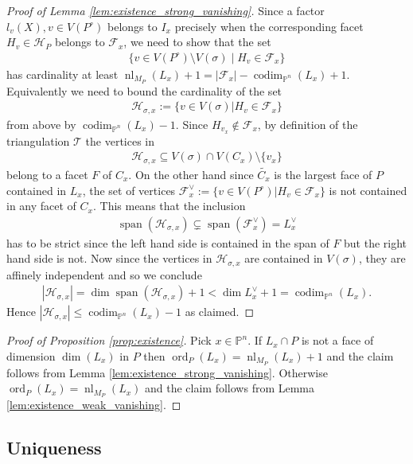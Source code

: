 \documentclass[a4paper,10pt]{amsart}
\theoremstyle{definition}
\theoremstyle{plain}
\newcommand{\codim}{\operatorname{codim}}
\newcommand{\ord}{\operatorname{ord}}
\newcommand{\nl}{\operatorname{nl}}
\newcommand{\Span}{\operatorname{span}}
\newcommand{\cF}{{\mathcal F}}
\newcommand{\cH}{{\mathcal H}}
\newcommand{\cT}{{\mathcal T}}
\newcommand{\pp}{\mathbb{P}}
\begin{document}
\begin{proof}[Proof of Lemma \ref{lem:existence_strong_vanishing}]
Since a factor $l_v(X), v \in V(P^\circ)$ belongs to $I_x$ precisely when the corresponding facet $H_v\in \cH_P$ belongs to $\cF_x$, we need to show that the set \begin{align*}
        \{v \in V(P^\circ)\setminus V(\sigma)\mid H_v \in \cF_x\}
    \end{align*}
    has cardinality at least $\nl_{M_P}(L_x)+1=|\cF_x|-\codim_{\pp^n}(L_x)+1$. Equivalently we need to bound the cardinality of the set \begin{align*}
       \cH_{\sigma,x}:= \{v \in V(\sigma)| H_v\in \cF_x\} 
    \end{align*}
    from above by $\codim_{\pp^n}(L_x)-1$. Since $H_{v_x}\notin \cF_x$, by definition of the triangulation $\cT$ the vertices in \begin{align*}
        \cH_{\sigma,x}\subseteq V(\sigma)\cap V(C_x)\setminus \{v_x\}
    \end{align*}
    belong to a facet $F$ of $C_x$. On the other hand since $\widetilde{C_x}$ is the largest face of $P$ contained in $L_x$, the set of vertices $\cF_x^\vee:=\{v\in V(P^\circ)|H_v\in \cF_x\}$ is not contained in any facet of $C_x$. This means that the inclusion
    \begin{align*}
    \Span(\cH_{\sigma,x})\subsetneq \Span(\cF_x^\vee) = L_x^\vee
    \end{align*}
    has to be strict since the left hand side is contained in the span of $F$ but the right hand side is not. Now since the vertices in $\cH_{\sigma,x}$ are contained in $V(\sigma)$, they are affinely independent and so we conclude \begin{align*}
        |\cH_{\sigma,x}|= \dim \Span(\cH_{\sigma,x})+1 < \dim L_x^\vee +1 = \codim_{\pp^n}(L_x).
    \end{align*}
    Hence $ |\cH_{\sigma,x}|\leq\codim_{\pp^n}(L_x)-1$ as claimed.
    
\end{proof}
\begin{proof}[Proof of Proposition \ref{prop:existence}]
    Pick $x\in \pp^n$. If $L_x\cap P$ is not a face of dimension $\dim(L_x)$ in $P$ then $\ord_P(L_x)=\nl_{M_P}(L_x)+1$ and the claim follows from Lemma \ref{lem:existence_strong_vanishing}. Otherwise $\ord_P(L_x)=\nl_{M_P}(L_x)$ and the claim follows from Lemma \ref{lem:existence_weak_vanishing}.
\end{proof}

 
\subsection{Uniqueness}
\end{document}
